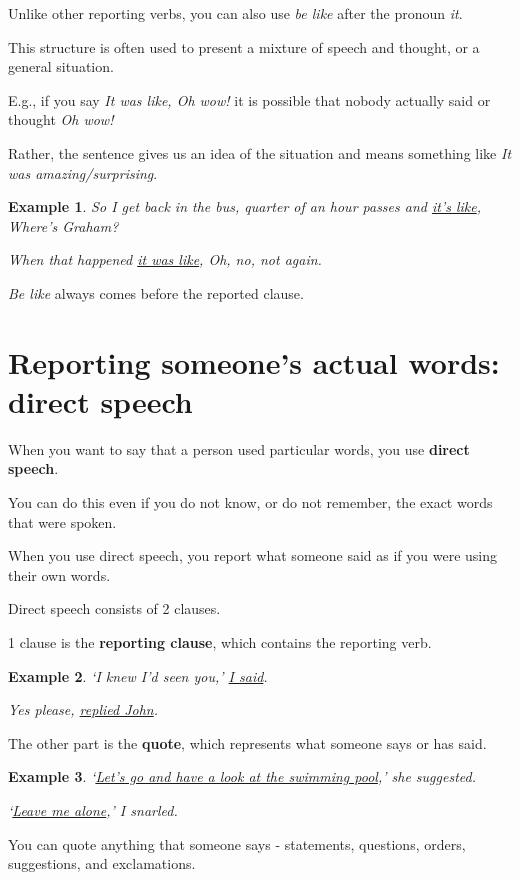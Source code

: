 \documentclass[oneside]{book}
\numberwithin{equation}{section}
\newtheorem{example}{Example}[section]
\begin{document}
%
Unlike other reporting verbs, you can also use \textit{be like} after the pronoun \textit{it}.

This structure is often used to present a mixture of speech and thought, or a general situation.

E.g., if you say \textit{It was like, Oh wow!} it is possible that nobody actually said or thought \textit{Oh wow!}

Rather, the sentence gives us an idea of the situation and means something like \textit{It was amazing/surprising}.
\begin{example}
    So I get back in the bus, quarter of an hour passes and \underline{it's like}, Where's Graham?
    
    When that happened \underline{it was like}, Oh, no, not again.
\end{example}
\textit{Be like} always comes before the reported clause.

\section{Reporting someone's actual words: direct speech}
\noindent{} When you want to say that a person used particular words, you use \textbf{direct speech}.

You can do this even if you do not know, or do not remember, the exact words that were spoken.

When you use direct speech, you report what someone said as if you were using their own words.

%
Direct speech consists of 2 clauses.

1 clause is the \textbf{reporting clause}, which contains the reporting verb.
\begin{example}
    `I knew I'd seen you,' \underline{I said}.
    
    Yes please, \underline{replied John}.
\end{example} 
The other part is the \textbf{quote}, which represents what someone says or has said.
\begin{example}
    `\underline{Let's go and have a look at the swimming pool},' she suggested.
    
    `\underline{Leave me alone},' I snarled.
\end{example}
You can quote anything that someone says - statements, questions, orders, suggestions, and exclamations.
\end{document}
